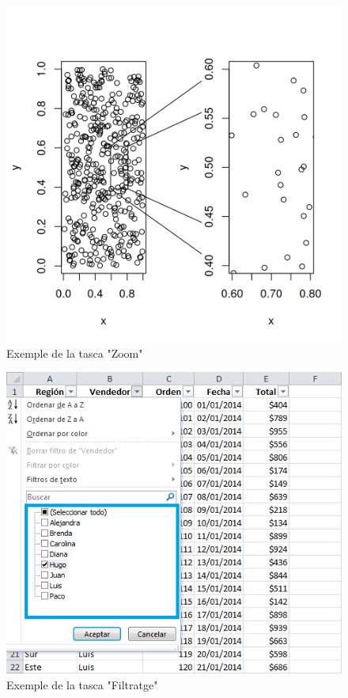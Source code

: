 \documentclass[a4paper,12pt]{report}
\begin{document}
\begin{figure}[H]
    \centering
    \includegraphics[scale = 0.8]{images/zoom.png}
    \caption{Exemple de la tasca "Zoom"}
    \label{fig:zoom}
\end{figure}
\begin{figure}
    \centering
    \includegraphics[scale = 0.7]{images/filtro.png}
    \caption{Exemple de la tasca "Filtratge"}
    \label{fig:filtratge}
\end{figure}
\end{document}
